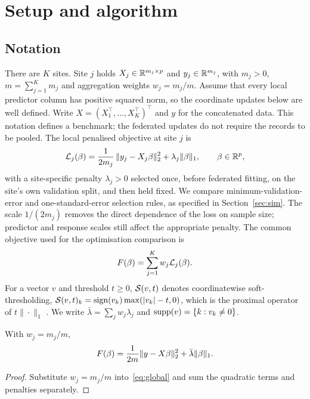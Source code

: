 \section{Setup and algorithm}
\label{sec:setup}

\subsection{Notation}

There are $K$ sites. Site $j$ holds $X_j \in \mathbb{R}^{m_j \times p}$ and
$y_j \in \mathbb{R}^{m_j}$, with $m_j>0$, $m = \sum_{j=1}^K m_j$ and
aggregation weights $w_j = m_j / m$. Assume that every local predictor
column has positive squared norm, so the coordinate updates below are
well defined. Write $X = (X_1^\top, \dots, X_K^\top)^\top$ and $y$ for
the concatenated data. This notation defines a benchmark; the federated
updates do not require the records to be pooled. The local penalised
objective at site $j$ is
\begin{equation}
\mathcal{L}_j(\beta)
 = \frac{1}{2 m_j}\, \| y_j - X_j \beta \|_2^2 + \lambda_j \|\beta\|_1 ,
\qquad \beta \in \mathbb{R}^p ,
\label{eq:local}
\end{equation}
with a site-specific penalty $\lambda_j > 0$ selected once, before
federated fitting, on the site's own validation split, and then held fixed.
We compare minimum-validation-error and one-standard-error selection
rules, as specified in Section~\ref{sec:sim}. The scale $1/(2m_j)$ removes
the direct dependence of the loss on sample size; predictor and response
scales still affect the appropriate penalty. The common objective used
for the optimisation comparison is
\begin{equation}
F(\beta) = \sum_{j=1}^K w_j \mathcal{L}_j(\beta) .
\label{eq:global}
\end{equation}
For a vector $v$ and threshold $t \ge 0$, $\mathcal{S}(v, t)$ denotes coordinatewise
soft-thresholding, $\mathcal{S}(v,t)_k = \operatorname{sign}(v_k)\max(|v_k| - t, 0)$, which is the
proximal operator of $t\|\cdot\|_1$ \citep{parikh2014}. We write
$\bar\lambda = \sum_j w_j \lambda_j$ and $\operatorname{supp}(v) = \{k : v_k \neq 0\}$.

\begin{lemma}
\label{lem:pooled}
With $w_j = m_j/m$,
\[
F(\beta)
 = \frac{1}{2m} \| y - X\beta \|_2^2 + \bar\lambda \|\beta\|_1 .
\]
\end{lemma}

\begin{proof}
Substitute $w_j=m_j/m$ into~\eqref{eq:global} and sum the quadratic
terms and penalties separately.
\end{proof}

